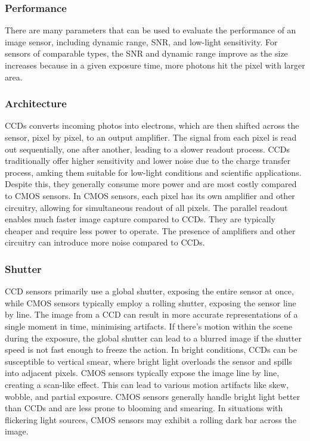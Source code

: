 \documentclass[10pt]{article}
\begin{document}
\begin{multicols}{2}
\subsubsection{Performance}
There are many parameters that can be used to evaluate the performance of an image sensor, including dynamic range, SNR, and low-light sensitivity. For sensors of comparable types, the SNR and dynamic range improve as the size increases because in a given exposure time, more photons hit the pixel with larger area.

\subsubsection{Architecture}
CCDs converts incoming photos into electrons, which are then shifted across the sensor, pixel by pixel, to an output amplifier. The signal from each pixel is read out sequentially, one after another, leading to a slower readout process. CCDs traditionally offer higher sensitivity and lower noise due to the charge transfer process, amking them suitable for low-light conditions and scientific applications. Despite this, they generally consume more power and are most costly compared to CMOS sensors.
\newline \newline
In CMOS sensors, each pixel has its own amplifier and other circuitry, allowing for simultaneous readout of all pixels. The parallel readout enables much faster image capture compared to CCDs. They are typically cheaper and require less power to operate.
The presence of amplifiers and other circuitry can introduce more noise compared to CCDs.

\subsubsection{Shutter}
CCD sensors primarily use a global shutter, exposing the entire sensor at once, while CMOS sensors typically employ a rolling shutter, exposing the sensor line by line.
\newline \newline
The image from a CCD can result in more accurate representations of a single moment in time, minimising artifacts. If there's motion within the scene during the exposure, the global shutter can lead to a blurred image if the shutter speed is not fast enough to freeze the action.
In bright conditions, CCDs can be susceptible to vertical smear, where bright light overloads the sensor and spills into adjacent pixels.
\newline \newline
CMOS sensors typically expose the image line by line, creating a scan-like effect. This can lead to various motion artifacts like skew, wobble, and partial exposure.
CMOS sensors generally handle bright light better than CCDs and are less prone to blooming and smearing. In situations with flickering light sources, CMOS sensors may exhibit a rolling dark bar across the image.


\end{multicols}
\end{document}
